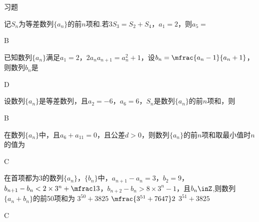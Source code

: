\begin{exercise}{\heiti 习题}\\
  \item %
    记$S_n$为等差数列$\{a_n\}$的前$n$项和.若$3S_3=S_2+S_4$，$a_1=2$，则$a_5=$\xz
    \begin{answer}
      B
    \end{answer}
  \item %
    已知数列$\{a_n\}$满足$a_1=2$，$2a_n a_{n+1}=a_n^2+1$，设$b_n=\mfrac{a_n-1}{a_n+1}$，则数列$b_n$是\xz
    \begin{answer}
      D
    \end{answer}
  \item %
    设数列$\{a_n\}$是等差数列，且$a_2=-6$，$a_6=6$，$S_n$是数列$\{a_n\}$的前$n$项和，则\xz
    \begin{answer}
      B
    \end{answer}
  \item %
    在数列$\{a_n\}$中，且$a_6+a_{11}=0$，且公差$d>0$，则数列$\{a_n\}$的前$n$项和取最小值时$n$的值为\xz
    \begin{answer}
      C
    \end{answer}
  \item %
    在首项都为3的数列$\{a_n\}$，$\{b_n\}$中，$a_{n+1}-a_n=3$，$b_2=9$，$b_{n+1}-b_n<2\times 3^n+\mfrac13$，$b_{n+2}-b_n>8\times 3^n-1$，且$b_n\inZ$,则数列$\{a_n+b_n\}$的前50项和为\xz
     {$3^{50}+3825$}
     {$\mfrac{3^{51}+7647}2$}
     {$3^{51}+3825$}
    \begin{answer}
      C

\end{answer}
\end{exercise}
